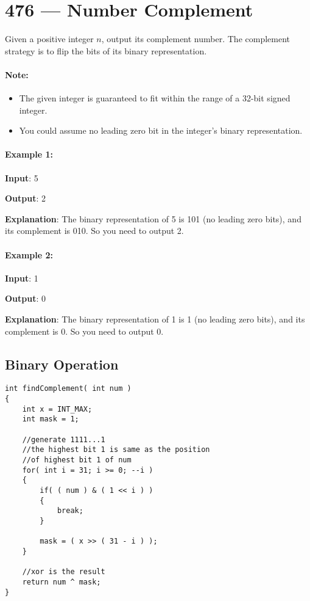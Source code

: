 \section{476 --- Number Complement}
Given a positive integer $n$, output its complement number. The complement strategy is to flip the bits of its binary representation.

\paragraph{Note:}
\begin{itemize}
\item The given integer is guaranteed to fit within the range of a 32-bit signed integer.
\item You could assume no leading zero bit in the integer's binary representation.
\end{itemize}

\paragraph{Example 1:}
\begin{flushleft}
\textbf{Input}: 5

\textbf{Output}: 2

\textbf{Explanation}: The binary representation of 5 is 101 (no leading zero bits), and its complement is 010. So you need to output 2.
\end{flushleft}

\paragraph{Example 2:}
\begin{flushleft}
\textbf{Input}: 1

\textbf{Output}: 0

\textbf{Explanation}: The binary representation of 1 is 1 (no leading zero bits), and its complement is 0. So you need to output 0.
\end{flushleft}

\subsection{Binary Operation}

\setcounter{lstlisting}{0}
\begin{lstlisting}[style=customc, caption={Binary Operation}]
int findComplement( int num )
{
    int x = INT_MAX;
    int mask = 1;

    //generate 1111...1
    //the highest bit 1 is same as the position
    //of highest bit 1 of num
    for( int i = 31; i >= 0; --i )
    {
        if( ( num ) & ( 1 << i ) )
        {
            break;
        }

        mask = ( x >> ( 31 - i ) );
    }

    //xor is the result
    return num ^ mask;
}
\end{lstlisting}